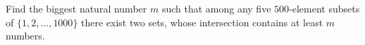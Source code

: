 Find the biggest natural number $m$ such that among any five \(500\)-element subsets of $\{ 1,2,\dots, 1000\}$ there exist two sets, whose intersection contains at least $m$ numbers.
